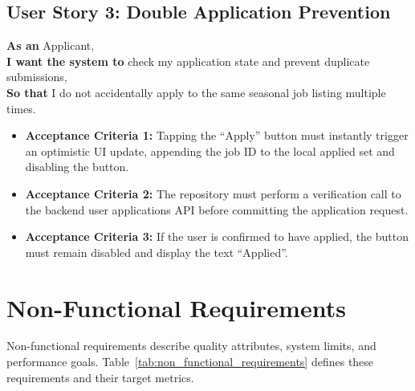 \subsection{User Story 3: Double Application Prevention}
\textbf{As an} Applicant,\\
\textbf{I want the system to} check my application state and prevent duplicate submissions,\\
\textbf{So that} I do not accidentally apply to the same seasonal job listing multiple times.
\begin{itemize}
    \item \textbf{Acceptance Criteria 1:} Tapping the ``Apply'' button must instantly trigger an optimistic UI update, appending the job ID to the local applied set and disabling the button.
    \item \textbf{Acceptance Criteria 2:} The repository must perform a verification call to the backend user applications API before committing the application request.
    \item \textbf{Acceptance Criteria 3:} If the user is confirmed to have applied, the button must remain disabled and display the text ``Applied''.
\end{itemize}

\section{Non-Functional Requirements}
Non-functional requirements describe quality attributes, system limits, and performance goals. Table~\ref{tab:non_functional_requirements} defines these requirements and their target metrics.

